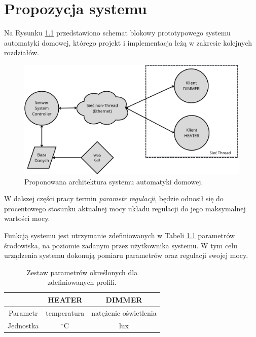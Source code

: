 \chapter{Propozycja systemu}
\label{cha:propozycja-systemu}

Na Rysunku \ref{fig:system-architecture} przedstawiono schemat blokowy prototypowego systemu automatyki domowej, którego projekt i implementacja leżą w zakresie kolejnych rozdziałów.

\begin{figure}[H]
    \centering
    \includegraphics[width=0.8\linewidth]{graphics/system-architecture.png}
    \caption{Proponowana architektura systemu automatyki domowej.}
    \label{fig:system-architecture}
\end{figure}

W dalszej części pracy termin \textit{parametr regulacji}, będzie odnosił się do procentowego stosunku aktualnej mocy układu regulacji do jego maksymalnej wartości mocy.

Funkcją systemu jest utrzymanie zdefiniowanych w Tabeli \ref{tab:profiles-parameters} parametrów środowiska, na poziomie zadanym przez użytkownika systemu. W tym celu urządzenia systemu dokonują pomiaru parametrów oraz regulacji swojej mocy.

\begin{table}[H]
    \centering
    \caption{Zestaw parametrów określonych dla zdefiniowanych profili.}
    \begin{tabular}{|c|c|c|}
         \hline
         \rowcolor{gray!20}
          & HEATER & DIMMER \\
         \hline
         \cellcolor{gray!20}Parametr & temperatura & natężenie oświetlenia \\
         \hline
         \cellcolor{gray!20}Jednostka & $^{\circ}$C & lux \\
         \hline
    \end{tabular}
    \label{tab:profiles-parameters}
\end{table}

